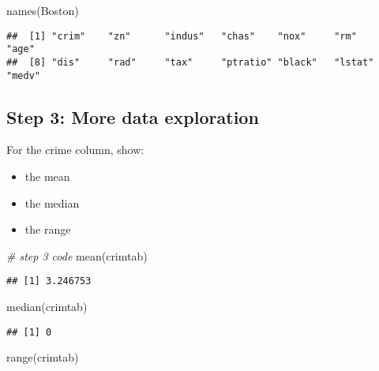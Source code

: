 \documentclass[
]{article}
\newenvironment{Shaded}{\begin{snugshade}}{\end{snugshade}}
\newcommand{\CommentTok}[1]{\textcolor[rgb]{0.56,0.35,0.01}{\textit{#1}}}
\newcommand{\FunctionTok}[1]{\textcolor[rgb]{0.00,0.00,0.00}{#1}}
\newcommand{\NormalTok}[1]{#1}
\providecommand{\tightlist}{%
  \setlength{\itemsep}{0pt}\setlength{\parskip}{0pt}}
\begin{document}
\begin{Shaded}
\begin{Highlighting}[]
\FunctionTok{names}\NormalTok{(Boston)}
\end{Highlighting}
\end{Shaded}

\begin{verbatim}
##  [1] "crim"    "zn"      "indus"   "chas"    "nox"     "rm"      "age"    
##  [8] "dis"     "rad"     "tax"     "ptratio" "black"   "lstat"   "medv"
\end{verbatim}

\hypertarget{step-3-more-data-exploration}{%
\subsection{Step 3: More data
exploration}\label{step-3-more-data-exploration}}

For the crime column, show:

\begin{itemize}
\tightlist
\item
  the mean
\item
  the median
\item
  the range
\end{itemize}

\begin{Shaded}
\begin{Highlighting}[]
\CommentTok{\# step 3 code}
\FunctionTok{mean}\NormalTok{(crimtab)}
\end{Highlighting}
\end{Shaded}

\begin{verbatim}
## [1] 3.246753
\end{verbatim}

\begin{Shaded}
\begin{Highlighting}[]
\FunctionTok{median}\NormalTok{(crimtab)}
\end{Highlighting}
\end{Shaded}

\begin{verbatim}
## [1] 0
\end{verbatim}

\begin{Shaded}
\begin{Highlighting}[]
\FunctionTok{range}\NormalTok{(crimtab)}
\end{Highlighting}
\end{Shaded}
\end{document}

